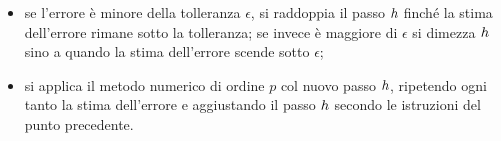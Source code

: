 \begin{Definition}
\begin{itemize}
		\item se l'errore \`e minore della tolleranza $\epsilon$, si raddoppia il passo $h$ finch\'e la stima dell'errore rimane sotto la tolleranza; se invece \`e maggiore di $\epsilon$ si dimezza $h$ sino a quando la stima dell'errore scende sotto $\epsilon$;
		\item si applica il metodo numerico di ordine $p$ col nuovo passo $h$, ripetendo ogni tanto la stima dell'errore e aggiustando il passo $h$ secondo le istruzioni del punto precedente.
	\end{itemize}
\end{Definition}




